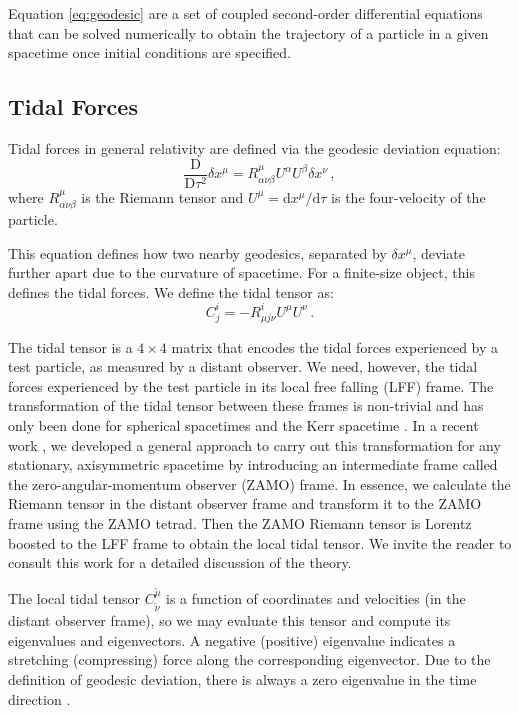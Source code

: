\documentclass[11pt, twocolumn]{article}
\begin{document}
Equation \eqref{eq:geodesic} are a set of coupled second-order differential equations that can be solved numerically to obtain the trajectory of a particle in a given spacetime once initial conditions are specified.


\subsection{Tidal Forces}


Tidal forces in general relativity are defined via the geodesic deviation equation:
\begin{equation}
    \frac{\mathrm{D}}{\mathrm{D} \tau^{2}} \delta x^{\mu} = R^{\mu}_{\alpha\nu\beta} U^{\alpha} U^{\beta} \delta x^{\nu} \, ,
\end{equation}
where $R^{\mu}_{\alpha\nu\beta}$ is the Riemann tensor and $U^{\mu} = \mathrm{d}x^{\mu}/\mathrm{d}\tau$ is the four-velocity of the particle.

This equation defines how two nearby geodesics, separated by $\delta x^{\mu}$, deviate further apart due to the curvature of spacetime. For a finite-size object, this defines the tidal forces. We define the tidal tensor as:
\begin{equation}
    C^{i}_{j} = -R^{i}_{\mu j \nu} U^{\mu} U^{\nu} \, .
\end{equation}

The tidal tensor is a $4 \times 4$ matrix that encodes the tidal forces experienced by a test particle, as measured by a distant observer. We need, however, the tidal forces experienced by the test particle in its local free falling (LFF) frame. The transformation of the tidal tensor between these frames is non-trivial and has only been done for spherical spacetimes \cite{Vandeev2022} and the Kerr spacetime \cite{Marck1983}. In a recent work \cite{Anonymous2024}, we developed a general approach to carry out this transformation for any stationary, axisymmetric spacetime by introducing an intermediate frame called the zero-angular-momentum observer (ZAMO) frame. In essence, we calculate the Riemann tensor in the distant observer frame and transform it to the ZAMO frame using the ZAMO tetrad. Then the ZAMO Riemann tensor is Lorentz boosted to the LFF frame to obtain the local tidal tensor. We invite the reader to consult this work for a detailed discussion of the theory.

The local tidal tensor $C^{\tilde{\mu}}_{\tilde{\nu}}$ is a  function of coordinates and velocities (in the distant observer frame), so we may evaluate this tensor and compute its eigenvalues and eigenvectors. A negative (positive) eigenvalue indicates a stretching (compressing) force along the corresponding eigenvector. Due to the definition of geodesic deviation, there is always a zero eigenvalue in the time direction \cite{Anonymous2024}.
\end{document}
